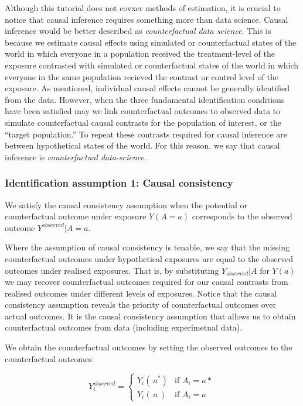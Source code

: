 \documentclass[
  singlecolumn]{report}
\begin{document}
Although this tutorial does not covxer methods of estimation, it is
crucial to notice that causal inference requires something more than
data science. Causal inference would be better described as
\emph{counterfactual data science}. This is because we estimate causal
effects using simulated or counterfactual states of the world in which
everyone in a population received the treatment-level of the exposure
contrasted with simulated or counterfactual states of the world in which
everyone in the same population recieved the contrast or control level
of the exposure. As mentioned, individual causal effects cannot be
generally identified from the data. However, when the three fundamental
identification conditions have been satisfied may we link counterfactual
outcomes to observed data to simulate counterfactual causal contrasts
for the population of interest, or the ``target population.'' To repeat
these contrasts required for causal inference are between hypothetical
states of the world. For this reason, we say that causal inference is
\emph{counterfactual data-science}.

\hypertarget{identification-assumption-1-causal-consistency}{%
\subsubsection{Identification assumption 1: Causal
consistency}\label{identification-assumption-1-causal-consistency}}

We satisfy the causal consistency assumption when the potential or
counterfactual outcome under exposure \(Y(A=a)\) corresponds to the
observed outcome \(Y^{observed}|A=a\).

Where the assumption of causal consistency is tenable, we say that the
missing counterfactual outcomes under hypothetical exposures are equal
to the observed outcomes under realised exposures. That is, by
substituting \(Y_{observed}|A\) for \(Y(a)\) we may recover
counterfactual outcomes required for our causal contrasts from realised
outcomes under different levels of exposures. Notice that the causal
consistency assumption reveals the priority of counterfactual outcomes
over actual outcomes. It is the causal consistency assumption that
allows us to obtain counterfactual outcomes from data (including
experimetnal data).

We obtain the counterfactual outcomes by setting the observed outcomes
to the counterfactual outcomes:

\[
Y^{observed}_i = 
\begin{cases} 
Y_i(~a^*) & \text{if } A_i = a* \\
Y_i(~a~) & \text{if } A_i = a
\end{cases}
\]
\end{document}
